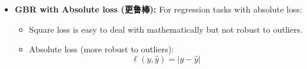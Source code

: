 \documentclass[UTF8]{ctexart}
\begin{document}
\begin{itemize}
\begin{itemize}
            \item Let $\sum_{i=1}^{n} h^2(\mathbf{x}_i) = \text{constant}$ (we can always normalize the predictions(对结果归一化处理)) and replace $q_i$ with $-2r_i$. We have
            \begin{align}
                h_{t+1} &= \arg\min_{h \in \mathbb{H}} \sum_{i=1}^{n} q_i h(\mathbf{x}_i) \notag \\
                &= \arg\min_{h \in \mathbb{H}} -2 \sum_{i=1}^{n} r_i h(\mathbf{x}_i) \notag \\
                &= \arg\min_{h \in \mathbb{H}} \sum_{i=1}^{n} \left( r_i^2 - 2r_i h(\mathbf{x}_i) + (h(\mathbf{x}_i))^2 \right) \\
                &= \arg\min_{h \in \mathbb{H}} \sum_{i=1}^{n} (h(\mathbf{x}_i) - r_i)^2 \notag
            \end{align}
            
            \item We train $h_{t+1}$ to predict $r_i$, which are from the old model $H_t$.
            
            \item The gradient is:
            \[\frac{\partial \mathcal{L}}{\partial [H(\mathbf{x}_i)]} = -2(y_i - H(\mathbf{x}_i))\]
            
            \item So we fit $h$ to the residuals:
            \[r_i = y_i - H(\mathbf{x}_i)\]
            
            \item Update the model:
            \[H_{t}(\mathbf{x}) = H_{t-1}(\mathbf{x}) + \alpha_t h_t(\mathbf{x})\]
        \end{itemize}
    \item \textbf{GBR with Absolute loss (更鲁棒): } For regression tasks with absolute loss:
        \begin{itemize}
            \item Square loss is easy to deal with mathematically but not robust to outliers.
            \item Absolute loss (more robust to outliers):
            \[\ell(y, \hat{y}) = |y - \hat{y}|\]
        \end{itemize}
        

\end{itemize}
\end{document}
